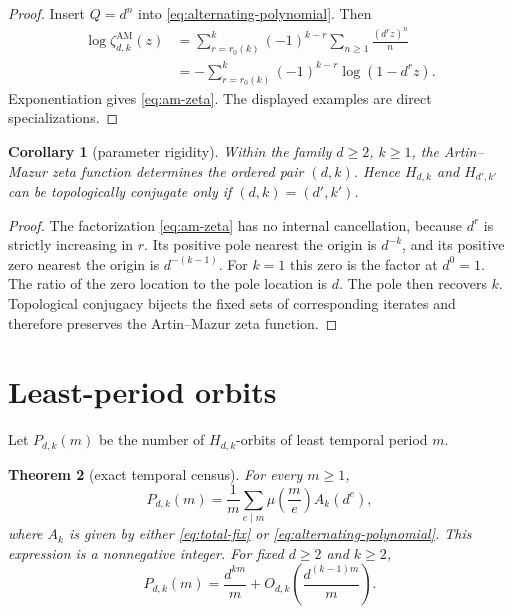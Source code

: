 \documentclass[11pt,a4paper]{amsart}
\newtheorem{theorem}{Theorem}[section]
\newtheorem{corollary}[theorem]{Corollary}
\theoremstyle{definition}
\theoremstyle{remark}
\newcommand{\mob}{\mu}
\newcommand{\AM}{\mathrm{AM}}
\begin{document}
\begin{proof}
Insert $Q=d^n$ into \eqref{eq:alternating-polynomial}.  Then
\begin{align*}
 \log\zeta^{\AM}_{d,k}(z)
 &=\sum_{r=r_0(k)}^k(-1)^{k-r}
   \sum_{n\geq1}\frac{(d^rz)^n}{n}\\
 &=-\sum_{r=r_0(k)}^k(-1)^{k-r}\log(1-d^rz).
\end{align*}
Exponentiation gives \eqref{eq:am-zeta}.  The displayed examples are direct
specializations.
\end{proof}

\begin{corollary}[parameter rigidity]\label{cor:rigidity}
Within the family $d\geq2$, $k\geq1$, the Artin--Mazur zeta function
determines the ordered pair $(d,k)$.  Hence $H_{d,k}$ and $H_{d',k'}$ can be
topologically conjugate only if $(d,k)=(d',k')$.
\end{corollary}

\begin{proof}
The factorization \eqref{eq:am-zeta} has no internal cancellation, because
$d^r$ is strictly increasing in $r$.  Its positive pole nearest the origin
is $d^{-k}$, and its positive zero nearest the origin is $d^{-(k-1)}$.  For
$k=1$ this zero is the factor at $d^0=1$.  The
ratio of the zero location to the pole location is $d$.  The pole then
recovers $k$.  Topological conjugacy bijects the fixed sets of corresponding
iterates and therefore preserves the Artin--Mazur zeta function.
\end{proof}

\section{Least-period orbits}

Let $P_{d,k}(m)$ be the number of $H_{d,k}$-orbits of least temporal period
$m$.

\begin{theorem}[exact temporal census]\label{thm:temporal}
For every $m\geq1$,
\begin{equation}\label{eq:temporal-census}
 P_{d,k}(m)=\frac1m\sum_{e\mid m}
 \mob\!\left(\frac me\right)A_k(d^e),
\end{equation}
where $A_k$ is given by either \eqref{eq:total-fix} or
\eqref{eq:alternating-polynomial}.  This expression is a nonnegative
integer.  For fixed $d\geq2$ and $k\geq2$,
\begin{equation}\label{eq:prime-orbit}
 P_{d,k}(m)=\frac{d^{km}}m
 +O_{d,k}\!\left(\frac{d^{(k-1)m}}m\right).
\end{equation}
\end{theorem}
\end{document}
